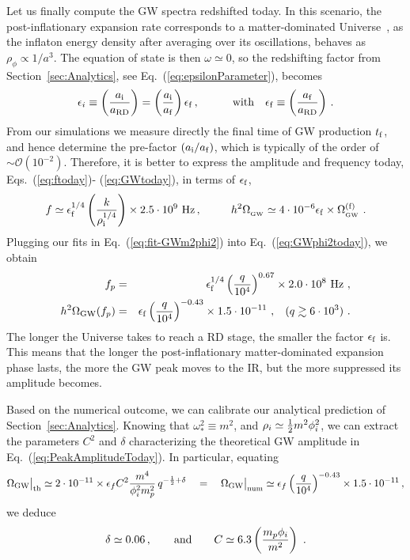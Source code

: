 \documentclass[a4paper,11pt]{article}
\newcommand{\bea}{\begin{eqnarray}}
\newcommand{\eea}{\end{eqnarray}}
\newcommand{\GW}{{_{\rm GW}}}
\begin{document}
Let us finally compute the GW spectra redshifted today. In this scenario, the post-inflationary expansion rate corresponds to a matter-dominated Universe~\cite{Turner:1983he}, as the inflaton energy density after averaging over its oscillations, behaves as $\rho_{\phi} \propto 1/a^3$. The equation of state is then $\omega \simeq 0$, so the redshifting factor from Section~\ref{sec:Analytics}, see Eq.~(\ref{eq:epsilonParameter}), becomes 
\begin{eqnarray}
\epsilon_i \equiv \left({a_{\rm i}\over a_{\rm RD}}\right) = \left({a_{\rm i}\over a_{\rm f}}\right)\epsilon_{\rm f}\,, ~~~~~~~~~{\rm with}~~~ \epsilon_{\rm f} \equiv \left({a_{\rm f}\over a_{\rm RD}}\right)\,.
\end{eqnarray}
From our simulations we measure directly the final time of GW production $t_{\rm f}$, and hence determine the pre-factor $(a_{\rm i}/a_{\rm f})$, which is typically of the order of $ \sim \mathcal{O} (10^{-2})$. Therefore, it is better to express the amplitude and frequency today, Eqs.~(\ref{eq:ftoday})- (\ref{eq:GWtoday}), in terms of $\epsilon_{\rm f}$,
\begin{eqnarray}\label{eq:GWphi2today}
f \simeq \epsilon_{\rm f}^{1/4}\left(\frac{k}{\rho_{\rm i}^{1/4}}\right) \times 2.5 \cdot 10^{9}~\mathrm{Hz}\,,~~~~~~~~ h^{2}\Omega_{\GW} \simeq  4\cdot 10^{-6} \epsilon_{\rm f} \times \Omega_{_{\rm GW}}^{({\rm f})} \ .
\end{eqnarray}
Plugging our fits in Eq.~(\ref{eq:fit-GWm2phi2}) into Eq.~(\ref{eq:GWphi2today}), we obtain
\bea \label{eq:m2phi2-finalfitFREQ}
f_p &=&  \epsilon_{\rm f}^{1/4} \left( \frac{q}{10^4} \right)^{0.67} \times 2.0 \cdot 10^{8} \ {\rm Hz}\ , \\
h^2 \Omega_{\rm GW} (f_p) &=&  \epsilon_{\rm f}  \left( \frac{q}{10^4} \right)^{-0.43} \times 1.5 \cdot 10^{-11}   \ , \hspace{0.3cm} (q \gtrsim 6 \cdot 10^3 )   \ . \label{eq:m2phi2-finalfit}
\eea
The longer the Universe takes to reach a RD stage, the smaller the factor $\epsilon_{\rm f}$ is. This means that the longer the post-inflationary matter-dominated expansion phase lasts, the more the GW peak moves to the IR, but the more suppressed its amplitude becomes.

Based on the numerical outcome, we can calibrate our analytical prediction of Section~\ref{sec:Analytics}. Knowing that $\omega_*^2 \equiv m^2$, 
and $\rho_i \simeq {1\over2}m^2\phi_i^2$, we can extract the parameters $C^2$ and $\delta$ characterizing the theoretical GW amplitude in Eq.~(\ref{eq:PeakAmplitudeToday}). 
In particular, equating
\begin{equation}
\Omega_{\rm GW}\big|_{\rm th} \simeq 2\cdot 10^{-11} \times \epsilon_f C^{2}\frac{m^{4}}{\phi_i^2 m_{p}^{2}}\,q^{-\frac{1}{2}+\delta} ~~~ = ~~~ \Omega_{\rm GW}\big|_{\rm num} \simeq \epsilon_f \left( \frac{q}{10^4} \right)^{-0.43} \times 1.5 \cdot 10^{-11}\,,
\end{equation}
we deduce
\begin{eqnarray}
\delta \simeq 0.06\,,~~~~~~{\rm and}~~~~~~ C \simeq 6.3\left(\frac{m_{p}\phi_i}{m^2}\right) \ .
\end{eqnarray}
\end{document}
